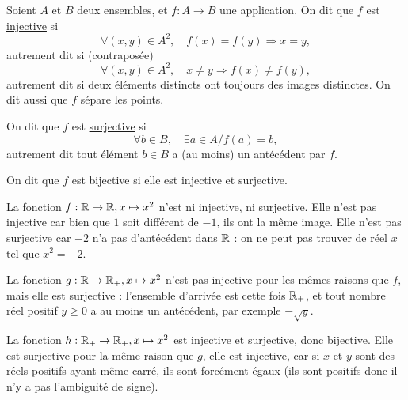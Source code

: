 


\begin{definition}\end{definition}
\begin{definition}Soient $A$ et $B$ deux ensembles, et $f : A \to B$ une application. On dit que $f$ est \underline{injective} si
\[\forall (x,y) \in A^2,\quad f(x)=f(y) \Rightarrow  x=y,\]
autrement dit si (contraposée) 
\[\forall (x,y) \in A^2,\quad x\neq y \Rightarrow  f(x)\neq f(y),\]
autrement dit si deux éléments distincts ont toujours des images distinctes. On dit aussi que $f$ \og sépare les points\fg.\end{definition}
\begin{definition}
On dit que $f$ est \underline{surjective} si
\[\forall b \in B,\quad \exists a\in A / f(a)=b,\]
autrement dit tout élément $b\in B$ a (au moins) un antécédent par $f$.
\end{definition}
\begin{definition}
On dit que $f$ est bijective si elle est injective et surjective.
\end{definition}

\begin{exemple}La fonction $f : \mathbb{R} \to \mathbb{R}, x\mapsto x^2$ n'est ni injective, ni surjective. Elle n'est pas injective car bien que $1$ soit différent de $-1$, ils ont la même image. Elle n'est pas surjective car $-2$ n'a pas d'antécédent dans $\mathbb{R}$ : on ne peut pas trouver de réel $x$ tel que $x^2 = -2$.\end{exemple}

\begin{exemple} La fonction $g : \mathbb{R} \to \mathbb{R}_+, x\mapsto x^2$ n'est pas injective pour les mêmes raisons que $f$, mais elle est surjective : l'ensemble d'arrivée est cette fois $\mathbb{R}_+$, et tout nombre réel positif $y\geq 0$ a au moins un antécédent, par exemple $-\sqrt{y}$.
\end{exemple}

\begin{exemple} La fonction $h : \mathbb{R}_+ \to \mathbb{R}_+, x\mapsto x^2$ est injective et surjective, donc bijective. Elle est surjective pour la même raison que $g$, elle est injective, car si $x$ et $y$ sont des réels positifs ayant même carré, ils sont forcément égaux (ils sont positifs donc il n'y a pas l'ambiguité de signe).
\end{exemple}


